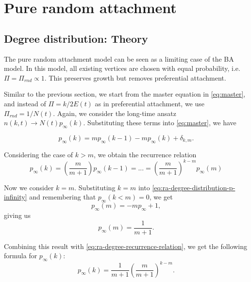 \section{Pure random attachment}\label{section:pure-random-attachment}

\subsection{Degree distribution: Theory}
The pure random attachment model can be seen as a limiting case of the BA model. In this model, all existing vertices are chosen with equal probability, i.e. $\Pi = \Pi_{rnd} \propto 1$. This preserves growth but removes preferential attachment. 

Similar to the previous section, we start from the master equation in \autoref{eq:master}, and instead of $\Pi = k/ 2E(t)$ as in preferential attachment, we use $\Pi_{rnd} = 1 / N(t)$. Again, we consider the long-time ansatz $n(k, t) \rightarrow N(t) p_{\infty}(k)$. Substituting these terms into \autoref{eq:master}, we have

\begin{equation}
	p_{\infty}(k) = m p_{\infty}(k-1) - m p_{\infty}(k) + \delta_{k, m}. 
	\label{eq:ra-degree-distribution-p-infinity}
\end{equation}

Considering the case of $k > m$, we obtain the recurrence relation
\begin{equation}
	p_{\infty}(k) = \left ( \frac{m}{m+1} \right ) p_{\infty}(k-1)=...= \left ( \frac{m}{m+1} \right )^{k-m} p_{\infty}(m)
	\label{eq:ra-degree-recurrence-relation}
\end{equation}

Now we consider $k=m$. Substituting $k=m$ into \autoref{eq:ra-degree-distribution-p-infinity} and remembering that $p_{\infty}(k < m) = 0$, we get
\begin{equation}
	p_{\infty}(m) = -mp_{\infty} + 1, 
	\label{eq:ra-degree-k-equal-m}
\end{equation}
giving us 
\begin{equation}
	p_{\infty}(m) = \frac{1}{m+1}. 
	\label{eq:ra-degree-p-infinity-m}
\end{equation}

Combining this result with \autoref{eq:ra-degree-recurrence-relation}, we get the following formula for $p_{\infty}(k)$:
\begin{equation}
	p_{\infty}(k) = \frac{1}{m+1} \left ( \frac{m}{m+1}\right )^{k-m}.
	\label{eq:p-infinity-solution-ra}
\end{equation}

